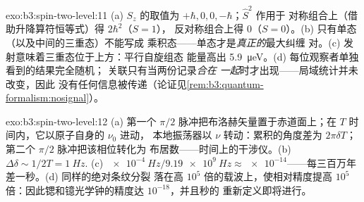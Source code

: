 \begin{solution}{exo:b3:spin-two-level:11}
(a) $S_z$ 的取值为 $+\hbar, 0, 0, -\hbar$；$\hat S^2$ 作用于
对称组合上（借助升降算符恒等式）得 $2\hbar^2$（$S = 1$），
反对称组合上得 $0$（$S = 0$）。(b)
只有单态（以及中间的三重态）不能写成
乘积态——单态才是\emph{真正的}最大纠缠
对。(c) 发射意味着三重态位于上方：平行自旋组态
能量高出 \qty{5.9}{\micro eV}。(d)
每位观察者单独看到的结果完全随机；
关联只有当两份记录\emph{合在
一起}时才出现——局域统计并未改变，因此
没有任何信息被传递（论证见\cref{rem:b3:quantum-formalism:nosignal}）。
\end{solution}

\begin{solution}{exo:b3:spin-two-level:12}
(a) 第一个 $\pi/2$ 脉冲把布洛赫矢量置于赤道面上；在
$T$ 时间内，它以原子自身的 $\nu_0$ 进动，
本地振荡器以 $\nu$ 转动：累积的角度差为
$2\pi\delta T$；第二个 $\pi/2$ 脉冲把该相位转化为
布居数——时间上的干涉仪。(b) $\Delta\delta \sim
1/2T = \qty{1}{Hz}$. (c) $\qty{e-4}{Hz}/\qty{9.19e9}{Hz} \approx
\num{e-14}$——每三百万年差一秒。(d) 同样的绝对条纹分裂
落在高 $10^5$ 倍的载波上，使相对精度提高
$10^5$ 倍：因此锶和镱光学钟的精度达
$10^{-18}$，并且秒的
重新定义即将进行。
\end{solution}

